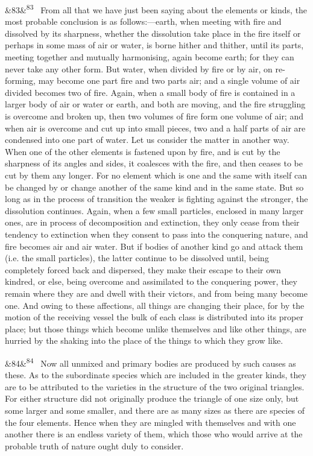 \documentclass[12pt]{article}
\newcommand{\para}[1][]{\par\noindent\ifx&#1&\else\textsuperscript{\footnotesize #1}~\fi}
\begin{document}
\para[83] From all that we have just been saying about the elements or kinds, the most probable conclusion is as follows:---earth, when meeting with fire and dissolved by its sharpness, whether the dissolution take place in the fire itself or perhaps in some mass of air or water, is borne hither and thither, until its parts, meeting together and mutually harmonising, again become earth; for they can never take any other form. But water, when divided by fire or by air, on re-forming, may become one part fire and two parts air; and a single volume of air divided becomes two of fire. Again, when a small body of fire is contained in a larger body of air or water or earth, and both are moving, and the fire struggling is overcome and broken up, then two volumes of fire form one volume of air; and when air is overcome and cut up into small pieces, two and a half parts of air are condensed into one part of water. Let us consider the matter in another way. When one of the other elements is fastened upon by fire, and is cut by the sharpness of its angles and sides, it coalesces with the fire, and then ceases to be cut by them any longer. For no element which is one and the same with itself can be changed by or change another of the same kind and in the same state. But so long as in the process of transition the weaker is fighting against the stronger, the dissolution continues. Again, when a few small particles, enclosed in many larger ones, are in process of decomposition and extinction, they only cease from their tendency to extinction when they consent to pass into the conquering nature, and fire becomes air and air water. But if bodies of another kind go and attack them (i.e. the small particles), the latter continue to be dissolved until, being completely forced back and dispersed, they make their escape to their own kindred, or else, being overcome and assimilated to the conquering power, they remain where they are and dwell with their victors, and from being many become one. And owing to these affections, all things are changing their place, for by the motion of the receiving vessel the bulk of each class is distributed into its proper place; but those things which become unlike themselves and like other things, are hurried by the shaking into the place of the things to which they grow like.

\para[84] Now all unmixed and primary bodies are produced by such causes as these. As to the subordinate species which are included in the greater kinds, they are to be attributed to the varieties in the structure of the two original triangles. For either structure did not originally produce the triangle of one size only, but some larger and some smaller, and there are as many sizes as there are species of the four elements. Hence when they are mingled with themselves and with one another there is an endless variety of them, which those who would arrive at the probable truth of nature ought duly to consider.
\end{document}
